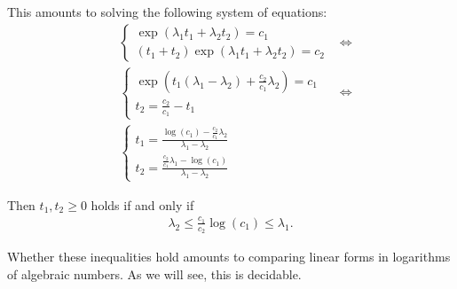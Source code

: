 This amounts to solving the following system of equations:
\begin{align*}
&\begin{cases}
\exp(\lambda_{1} t_{1} + \lambda_{2} t_{2}) = c_{1} \\
(t_{1} + t_{2}) \exp(\lambda_{1} t_{1} + \lambda_{2} t_{2}) = c_{2}
\end{cases}
&\Leftrightarrow \\
&\begin{cases}
\exp(t_{1} (\lambda_{1} - \lambda_{2}) + \frac{c_{2}}{c_{1}} \lambda_{2}) = c_{1} \\
t_{2} = \frac{c_{2}}{c_{1}} - t_{1}
\end{cases}
&\Leftrightarrow \\
&\begin{cases}
t_{1} = \frac{\log(c_{1}) - \frac{c_{2}}{c_{1}} \lambda_{2}}{\lambda_{1} - \lambda_{2}} \\
t_{2} = \frac{\frac{c_{2}}{c_{1}} \lambda_{1} - \log(c_{1})}{\lambda_{1} - \lambda_{2}}
\end{cases}
\end{align*}

Then $t_{1}, t_{2} \geq 0$ holds if and only if
\begin{align*}
\lambda_{2} \leq \frac{c_{1}}{c_{2}} \log(c_{1}) \leq \lambda_{1} .
\end{align*}

Whether these inequalities hold amounts to comparing linear forms in logarithms of algebraic numbers. As we will see, this is decidable.
